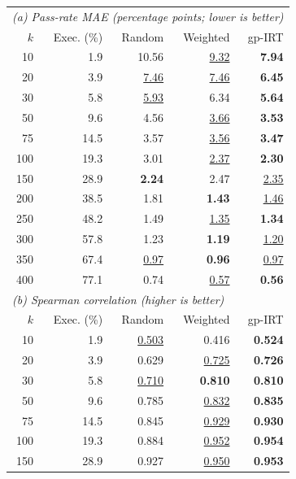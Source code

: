 \begin{table}[t]
  \centering
  \small
  \setlength{\tabcolsep}{3.5pt}
  \begin{tabular}{rrrrr}
    \toprule
    \multicolumn{5}{l}{\textit{(a) Pass-rate MAE (percentage points; lower is better)}} \\
    $k$ & Exec. (\%) & Random & Weighted & gp-IRT \\
    \midrule
    10 & 1.9 & 10.56 & \underline{9.32} & \textbf{7.94} \\
    20 & 3.9 & \underline{7.46} & \underline{7.46} & \textbf{6.45} \\
    30 & 5.8 & \underline{5.93} & 6.34 & \textbf{5.64} \\
    50 & 9.6 & 4.56 & \underline{3.66} & \textbf{3.53} \\
    75 & 14.5 & 3.57 & \underline{3.56} & \textbf{3.47} \\
    100 & 19.3 & 3.01 & \underline{2.37} & \textbf{2.30} \\
    150 & 28.9 & \textbf{2.24} & 2.47 & \underline{2.35} \\
    200 & 38.5 & 1.81 & \textbf{1.43} & \underline{1.46} \\
    250 & 48.2 & 1.49 & \underline{1.35} & \textbf{1.34} \\
    300 & 57.8 & 1.23 & \textbf{1.19} & \underline{1.20} \\
    350 & 67.4 & \underline{0.97} & \textbf{0.96} & \underline{0.97} \\
    400 & 77.1 & 0.74 & \underline{0.57} & \textbf{0.56} \\
    \midrule
    \multicolumn{5}{l}{\textit{(b) Spearman correlation (higher is better)}} \\
    $k$ & Exec. (\%) & Random & Weighted & gp-IRT \\
    \midrule
    10 & 1.9 & \underline{0.503} & 0.416 & \textbf{0.524} \\
    20 & 3.9 & 0.629 & \underline{0.725} & \textbf{0.726} \\
    30 & 5.8 & \underline{0.710} & \textbf{0.810} & \textbf{0.810} \\
    50 & 9.6 & 0.785 & \underline{0.832} & \textbf{0.835} \\
    75 & 14.5 & 0.845 & \underline{0.929} & \textbf{0.930} \\
    100 & 19.3 & 0.884 & \underline{0.952} & \textbf{0.954} \\
    150 & 28.9 & 0.927 & \underline{0.950} & \textbf{0.953} \\

\end{tabular}
\end{table}
